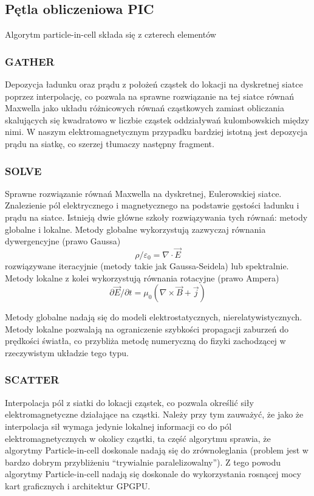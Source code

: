     \subsection{Pętla obliczeniowa PIC}
    Algorytm particle-in-cell składa się z czterech elementów 
    \subsubsection{GATHER}
    Depozycja ładunku oraz prądu z położeń cząstek do lokacji na dyskretnej siatce poprzez interpolację,
    co pozwala na sprawne rozwiązanie na tej siatce
    równań Maxwella jako układu różnicowych równań cząstkowych zamiast obliczania skalujących się kwadratowo w liczbie cząstek
    oddziaływań kulombowskich między nimi.
    W naszym elektromagnetycznym przypadku bardziej istotną jest depozycja prądu na siatkę, co szerzej tłumaczy następny
    fragment. 
    \subsubsection{SOLVE}
    Sprawne rozwiązanie równań Maxwella na dyskretnej, Eulerowskiej siatce.
    Znalezienie pól elektrycznego i magnetycznego
    na podstawie gęstości ładunku i prądu na siatce.
    Istnieją dwie główne szkoły rozwiązywania tych równań: metody globalne i lokalne. Metody globalne wykorzystują
    zazwyczaj równania dywergencyjne (prawo Gaussa)
    \begin{equation}
        \rho / \varepsilon_0 = \nabla \cdot \vec{E}
        \label{poisson-eq}    
    \end{equation}
    rozwiązywane iteracyjnie (metody takie jak Gaussa-Seidela)
    lub spektralnie.
    Metody lokalne z kolei wykorzystują równania rotacyjne (prawo Ampera) 
    \begin{equation}
        \partial \vec{E} / \partial t = \mu_0(\nabla \times \vec{B} + \vec{j})
        \label{FIXME}
    \end{equation}

    Metody globalne nadają się do modeli elektrostatycznych, nierelatywistycznych. 
    Metody lokalne pozwalają na ograniczenie szybkości propagacji zaburzeń do prędkości światła, co przybliża
    metodę numeryczną do fizyki zachodzącej w rzeczywistym układzie tego typu.
    \subsubsection{SCATTER}
    Interpolacja pól z siatki do lokacji cząstek, co pozwala określić siły elektromagnetyczne działające na cząstki.
    Należy przy tym zauważyć, że jako że interpolacja sił wymaga jedynie lokalnej informacji co do pól
    elektromagnetycznych w okolicy cząstki, ta część algorytmu sprawia, że algorytmy Particle-in-cell doskonale
    nadają się do zrównoleglania (problem jest w bardzo dobrym przybliżeniu ``trywialnie paralelizowalny''). Z tego powodu algorytmy
    Particle-in-cell nadają się doskonale do wykorzystania rosnącej mocy kart graficznych i architektur GPGPU.
